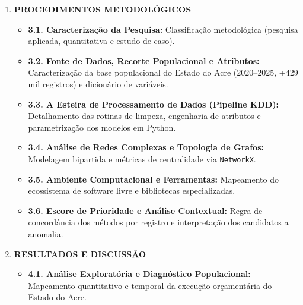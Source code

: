 \documentclass[
    12pt,               %
    openright,          %
    oneside,            %
    a4paper,            %
    chapter=TITLE,      %
    sumario=tradicional,%
    english,            %
    brazilian,          %
 ]{abntex2}
\begin{document}
\begin{enumerate}
\begin{itemize}
        \item \textbf{2.2. O Processo KDD e a Análise Populacional:} O ciclo de descoberta de conhecimento em bases de dados e a transição da amostragem para a análise de 100\% dos registros.
        \item \textbf{2.3. Filtros Estatísticos de Distribuição:} Fundamentos da Lei de Newcomb-Benford, Teste Qui-Quadrado ($\chi^2$) e o $Z$-Score.
        \item \textbf{2.4. Aprendizado de Máquina Não Supervisionado:} Funcionamento dos algoritmos \textit{Isolation Forest} (ISO) e \textit{Local Outlier Factor} (LOF).
        \item \textbf{2.5. Mineração de Texto em Históricos Contábeis:} Vetorização TF-IDF e agrupamento via DBSCAN para contextualizar sinalizações textuais.
        \item \textbf{2.6. Trabalhos Relacionados:} Mapeamento do estado da arte e lacunas na literatura nacional.
    \end{itemize}
    \item \textbf{PROCEDIMENTOS METODOLÓGICOS}
    \begin{itemize}
        \item \textbf{3.1. Caracterização da Pesquisa:} Classificação metodológica (pesquisa aplicada, quantitativa e estudo de caso).
        \item \textbf{3.2. Fonte de Dados, Recorte Populacional e Atributos:} Caracterização da base populacional do Estado do Acre (2020--2025, +429 mil registros) e dicionário de variáveis.
        \item \textbf{3.3. A Esteira de Processamento de Dados (Pipeline KDD):} Detalhamento das rotinas de limpeza, engenharia de atributos e parametrização dos modelos em Python.
        \item \textbf{3.4. Análise de Redes Complexas e Topologia de Grafos:} Modelagem bipartida e métricas de centralidade via \texttt{NetworkX}.
        \item \textbf{3.5. Ambiente Computacional e Ferramentas:} Mapeamento do ecossistema de software livre e bibliotecas especializadas.
        \item \textbf{3.6. Escore de Prioridade e Análise Contextual:} Regra de concordância dos métodos por registro e interpretação dos candidatos a anomalia.
    \end{itemize}
    \item \textbf{RESULTADOS E DISCUSSÃO}
    \begin{itemize}
        \item \textbf{4.1. Análise Exploratória e Diagnóstico Populacional:} Mapeamento quantitativo e temporal da execução orçamentária do Estado do Acre.

\end{itemize}
\end{enumerate}
\end{document}
